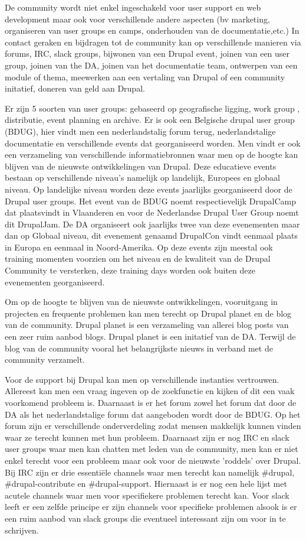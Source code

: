 De community wordt niet enkel ingeschakeld voor user support en web development maar ook voor verschillende andere aspecten (bv marketing, organiseren van user groups en camps, onderhouden van de documentatie,etc.) In contact geraken en bijdragen tot de community kan op verschillende manieren via forums, IRC, slack groups, bijwonen van een Drupal event, joinen van een user group, joinen van the DA, joinen van het documentatie team, ontwerpen van een module of thema, meewerken aan een vertaling van Drupal of een community initatief, doneren van geld aan Drupal. 

Er zijn 5 soorten van user groups: gebaseerd op geografische ligging, work group , distributie, event planning en archive. Er is ook een Belgische drupal user group (BDUG), hier vindt men een nederlandstalig forum terug, nederlandstalige documentatie en verschillende events dat georganiseerd worden. Men vindt er ook een verzameling van verschillende informatiebronnen waar men op de hoogte kan blijven van de nieuwste ontwikkelingen van Drupal. Deze educatieve events bestaan op verschillende niveau's namelijk op landelijk, Europees en globaal niveau. Op landelijke niveau worden deze events jaarlijks georganiseerd door de Drupal user groups. Het event van de BDUG noemt respectievelijk DrupalCamp dat plaatsvindt in Vlaanderen en voor de Nederlandse Drupal User Group noemt dit DrupalJam. De DA organiseert ook jaarlijks twee van deze evenementen maar dan op Globaal niveau, dit evenement genaamd DrupalCon vindt eenmaal plaats in Europa en eenmaal in Noord-Amerika. Op deze events zijn meestal ook training momenten voorzien om het niveau en de kwaliteit van de Drupal Community te versterken, deze training days worden ook buiten deze evenementen georganiseerd.

Om op de hoogte te blijven van de nieuwste ontwikkelingen, vooruitgang in projecten en frequente problemen kan men terecht op Drupal planet en de blog van de community. Drupal planet is een verzameling van allerei blog posts van een zeer ruim aanbod blogs. Drupal planet is een initatief van de DA. Terwijl de blog van de community vooral het belangrijkste nieuws in verband met de community verzamelt.

Voor de support bij Drupal kan men op verschillende instanties vertrouwen. Allereest kan men een vraag ingeven op de zoekfunctie en kijken of dit een vaak voorkomend probleem is. Daarnaast is er het forum zowel het forum dat door de DA als het nederlandstalige forum dat aangeboden wordt door de BDUG. Op het forum zijn er verschillende onderverdeling zodat mensen makkelijk kunnen vinden waar ze terecht kunnen met hun probleem. Daarnaast zijn er nog IRC en slack user groups waar men kan chatten met leden van de community, men kan er niet enkel terecht voor een probleem maar ook voor de nieuwste 'roddels' over Drupal. Bij IRC zijn er drie essentiële channels waar men terecht kan namelijk \#drupal, \#drupal-contribute en \#drupal-support. Hiernaast is er nog een hele lijst met acutele channels waar men voor specifiekere problemen terecht kan. Voor slack leeft er een zelfde principe er zijn channels voor specifieke problemen alsook is er een ruim aanbod van slack groups die eventueel interessant zijn om voor in te schrijven.

